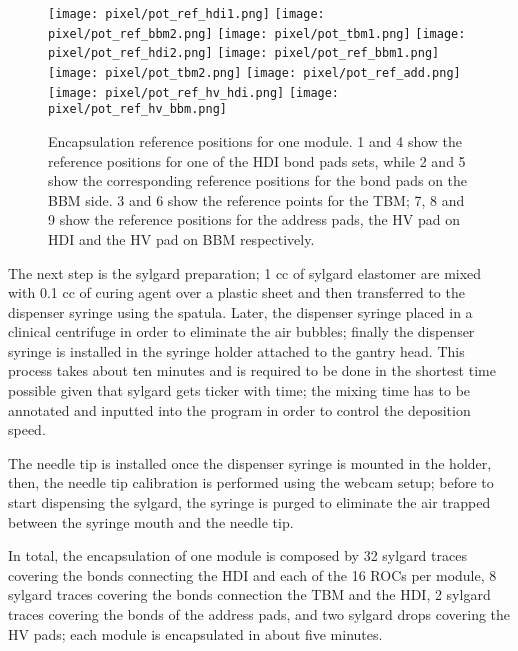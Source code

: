 \begin{figure}[h]
\begin{center}
  \texttt{[image: pixel/pot\_ref\_hdi1.png]}
  \texttt{[image: pixel/pot\_ref\_bbm2.png]}
  \texttt{[image: pixel/pot\_tbm1.png]}
  \texttt{[image: pixel/pot\_ref\_hdi2.png]}
  \texttt{[image: pixel/pot\_ref\_bbm1.png]}
  \texttt{[image: pixel/pot\_tbm2.png]}
  \texttt{[image: pixel/pot\_ref\_add.png]}
  \texttt{[image: pixel/pot\_ref\_hv\_hdi.png]}
  \texttt{[image: pixel/pot\_ref\_hv\_bbm.png]}
 \caption[Encapsulation reference positions.]{Encapsulation reference positions for one module. 1 and 4 show the reference positions for one of the HDI bond pads sets, while 2 and 5 show the corresponding reference positions for the bond pads on the BBM side. 3 and 6 show the reference points for the TBM; 7, 8 and 9 show the reference positions for the address pads, the HV pad on HDI and the HV pad on BBM respectively.}\label{fig:potting_references}
\end{center}
\end{figure}

The next step is the sylgard preparation; 1 cc of sylgard elastomer are mixed with 0.1 cc of curing agent over a plastic sheet and then transferred to the dispenser syringe using the spatula. Later, the dispenser syringe placed in a clinical centrifuge in order to eliminate the air bubbles; finally the dispenser syringe is installed in the syringe holder attached to the gantry head. This process takes about ten minutes and is required to be done in the shortest time possible given that sylgard gets ticker with time; the mixing time has to be annotated and inputted into the program in order to control the deposition speed.

The needle tip is installed once the dispenser syringe is mounted in the holder, then, the needle tip calibration is performed using the webcam setup; before to start dispensing the sylgard, the syringe is purged to eliminate the air trapped between the syringe mouth and the needle tip.

In total, the encapsulation of one module is composed by 32 sylgard traces covering the bonds connecting the HDI and each of the 16 ROCs per module, 8 sylgard traces covering the bonds connection the TBM and the HDI, 2 sylgard traces covering the bonds of the address pads, and two sylgard drops covering the HV pads; each module is encapsulated in about five minutes. 


